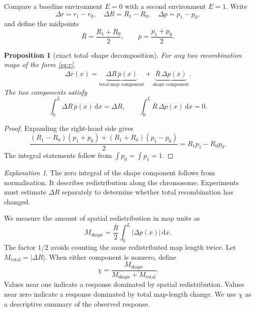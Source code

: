 \documentclass[11pt]{article}
\newtheorem{proposition}{Proposition}
\theoremstyle{remark}
\newtheorem*{remark}{Explanation}
\newcommand{\dd}{\,\mathrm{d}}
\newcommand{\Rbar}{\overline{R}}
\newcommand{\pbar}{\overline{p}}
\begin{document}
Compare a baseline environment $E=0$ with a second environment $E=1$. Write
\[
\Delta r=r_1-r_0,
\quad
\Delta R=R_1-R_0,
\quad
\Delta p=p_1-p_0,
\]
and define the midpoints
\[
\Rbar=\frac{R_1+R_0}{2},
\qquad
\pbar=\frac{p_1+p_0}{2}.
\]

\begin{proposition}[exact total--shape decomposition]
\label{prop:decomp}
For any two recombination maps of the form \eqref{eq:r},
\begin{equation}
\boxed{\;
\Delta r(x)=\underbrace{\Delta R\,\pbar(x)}_{\text{total-map component}}
+\underbrace{\Rbar\,\Delta p(x)}_{\text{shape component}}.
\;}
\label{eq:decomp}
\end{equation}
The two components satisfy
\begin{equation}
\int_0^L \Delta R\,\pbar(x)\dd x=\Delta R,
\qquad
\int_0^L \Rbar\,\Delta p(x)\dd x=0.
\label{eq:decomp_integrals}
\end{equation}
\end{proposition}

\begin{proof}
Expanding the right-hand side gives
\[
\frac{(R_1-R_0)(p_1+p_0)+(R_1+R_0)(p_1-p_0)}{2}
=R_1p_1-R_0p_0.
\]
The integral statements follow from $\int p_0=\int p_1=1$.
\end{proof}

\begin{remark}
The zero integral of the shape component follows from normalisation. It describes
redistribution along the chromosome. Experiments must estimate $\Delta R$
separately to determine whether total recombination has changed.
\end{remark}

We measure the amount of spatial redistribution in map units as
\begin{equation}
M_{\mathrm{shape}}
=\frac{\Rbar}{2}\int_0^L |\Delta p(x)|\dd x.
\label{eq:mshape}
\end{equation}
The factor $1/2$ avoids counting the same redistributed map length twice. Let $M_{\mathrm{total}}=|\Delta R|$. When either component is
nonzero, define
\begin{equation}
\chi
=\frac{M_{\mathrm{shape}}}
{M_{\mathrm{shape}}+M_{\mathrm{total}}}.
\label{eq:chi}
\end{equation}
Values near one indicate a response dominated by spatial redistribution. Values
near zero indicate a response dominated by total map-length change. We use $\chi$
as a descriptive summary of the observed response.
\end{document}
